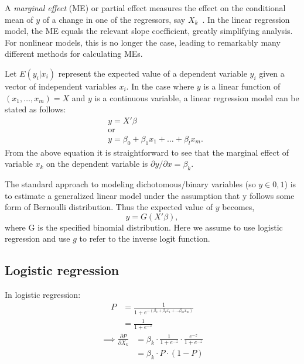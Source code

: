 A \emph{marginal effect} (ME) or partial effect measures the effect on the
conditional mean of $y$ of a change in one of the regressors, say
$X_k$~\cite{cameron2009}. In the linear regression model, the ME equals the
relevant slope coefficient, greatly simplifying analysis. For nonlinear models,
this is no longer the case, leading to remarkably many different methods for
calculating MEs.

Let $E(y_i | x_i)$ represent the expected value of a dependent variable $y_i$
given a vector of independent variables $x_i$. In the case where $y$ is a
linear function of $(x_1, \dots, x_m) = X$ and $y$ is a continuous variable, a
linear regression model can be stated as follows:
\begin{align*}
    & y = X' \beta \\
    & \text{or} \\
    & y = \beta_0 + \beta_1 x_1 +  \dots  + \beta_l x_m.
\end{align*}
From the above equation it is straightforward to see that the marginal effect of
variable $x_k$ on the dependent variable is $\partial y / \partial x = \beta_k$.

The standard approach to modeling dichotomous/binary variables
(so $y \in {0, 1}$) is to estimate a generalized linear model under the
assumption that y follows some form of Bernoulli distribution. Thus the expected
value of $y$ becomes,
\begin{equation*}
    y = G(X' \beta),
  \end{equation*}
where G is the specified binomial distribution. Here we assume to use
logistic regression and use $g$ to refer to the inverse logit function.

\subsection{Logistic regression} %
\label{sub:logistic_regression}
In logistic regression:
\begin{align*}
  P &= \frac{1}{1 + e^{-(\beta_0 + \beta_1 x_1 + \dots  \beta_m x_m)}} \\
    &= \frac{1}{1 + e^{-z}}
\end{align*}
\begin{align*}
  \implies \frac{\partial P}{\partial X_k} &= \beta_k \cdot \frac{1}{1 + e^{-z}} \cdot
              \frac{e^{-z}}{1 + e^{-z}} \\
      &= \beta_k \cdot P \cdot (1-P)
\end{align*}



